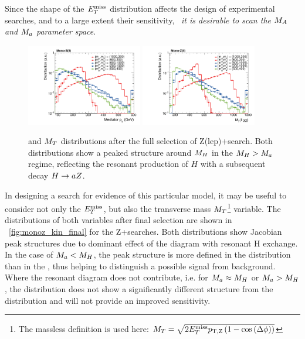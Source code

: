 Since the shape of the $E_T^\mathrm{miss}$ distribution affects the design of experimental searches, and to a large extent their sensitivity, ~\emph{it is desirable to scan the $M_{A}$ and $M_{a}$ parameter space}. 


\begin{figure}%
\centering

\includegraphics[width=0.45\textwidth]{texinputs/04_grid/figures/monoz/leptonic/dmwg-final_h_pt_med_dm.pdf}
\includegraphics[width=0.45\textwidth]{texinputs/04_grid/figures/monoz/leptonic/dmwg-final_h_mt_total.pdf}
\caption{\MET and  $M_{T}$ distributions after the full selection of Z(lep)+\MET search. Both distributions show a peaked structure around $M_{H}$ in the $M_{H} > M_{a}$ regime, reflecting the resonant production of $H$ with a subsequent decay $H\to aZ$.\label{fig:monoz_kin_final}}

\end{figure}

In designing a search for evidence of this particular model, it may be useful to consider not only the $E_T^\mathrm{miss}$, but also the transverse mass $M_{T}$\footnote{The massless definition is used here: $M_{T} = \sqrt{2 E_T^\mathrm{miss} p_{\rm{T,Z}} \left(1-\cos\left(\Delta\phi\right)\right)}$} variable. 
The distributions of both variables after final selection are shown in ~\autoref{fig:monoz_kin_final} for the Z+\MET searches. 
Both distributions show Jacobian peak structures due to dominant effect of the diagram with resonant H exchange. 
In the case of $M_{a}<M_{H}$, the peak structure is more defined in the \MT distribution than in the \MET, thus helping to distinguish a possible signal from background. 
Where the resonant diagram does not contribute, i.e. for $M_{a}\approx M_{H}$ or $M_{a}>M_{H}$, the \MT distribution does not show a significantly different structure from the \MET distribution and will not provide an improved sensitivity.

